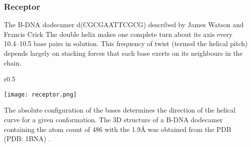 \frametitle{Receptor}
The B-DNA dodecamer d(CGCGAATTCGCG) described by James Watson and Francis Crick The double helix makes one complete turn about its axis every 10.4–10.5 base pairs in solution. This frequency of twist (termed the helical pitch) depends largely on stacking forces that each base exerts on its neighbours in the chain. \begin{wrapfigure}{r}{0.5\textwidth}
	\vspace{-2em}
	\begin{center}
		\texttt{[image: receptor.png]}
	\end{center}
\end{wrapfigure}The absolute configuration of the bases determines the direction of the helical curve for a given conformation. The 3D structure of a B-DNA dodecamer containing the atom count of 486 with the 1.9Å was obtained from the PDB (PDB: 1BNA) \cite{drew1981structure}.
